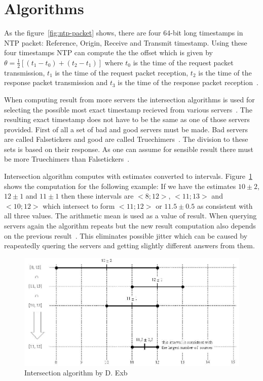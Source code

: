 
\section{Algorithms}
As the figure~\ref{fig:ntp-packet} shows, there are four 64-bit long timestamps
in NTP packet: Reference, Origin, Receive and Transmit timestamp.
Using these four timestamps NTP can compute the
the offset which is given by $\theta = \frac{1}{2}[(t_1 - t_0) + (t_2 - t_1)]$
where $t_0$ is the time of the request packet transmission,
$t_1$ is the time of the request packet reception,
$t_2$ is the time of the response packet transmission and
$t_3$ is the time of the response packet reception~\cite{ntp-algor}.


When computing result from more servers the intersection algorithms is used
for selecting the possible most exact timestamp recieved from various servers~\cite{rfc5905}.
The resulting exact timestamp does not have to be the same
as one of those servers provided.
First of all a set of bad and good servers must be made.
Bad servers are called Falsetickers and good are called Truechimers~\cite{rfc5905}.
The division to these sets is based on their response.
As one can assume for sensible result there must be more Truechimers than Falsetickers~\cite{rfc5905}.

Intersection algorithm computes with estimates converted to intervals.
Figure~\ref{fig:ntp-intersection} shows the computation for the following example:
If we have the estimates $10 \pm 2$, $12 \pm 1$ and $11 \pm 1$
then these intervals are $<8; 12>$, $<11; 13>$ and $<10; 12>$ which
intersect to form $<11; 12>$ or $11.5 \pm 0.5$ as consistent with all three values.
The arithmetic mean is used as a value of result.
When querying servers again the algorithm repeats but the new result computation
also depends on the previous result~\cite{rfc5905}.
This eliminates possible jitter which can be caused by reapeatedly quering the servers
and getting slightly different answers from them.

\begin{figure}
	\centering
	\includegraphics[width=13cm,keepaspectratio]{fig/Marzullo_example-1.jpg}
	\caption{Intersection algorithm by D. Exb}
	\label{fig:ntp-intersection}
	\bigskip
\end{figure}

